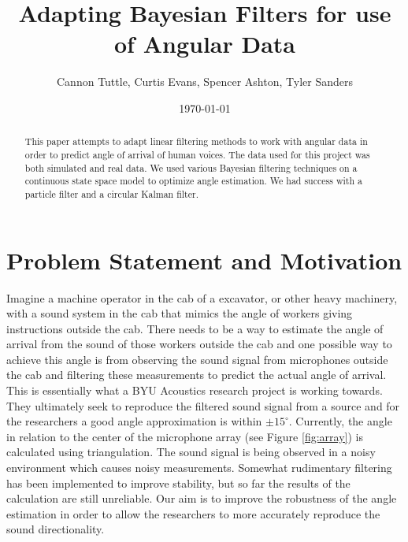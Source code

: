 \documentclass[11pt]{amsart}
\begin{document}
\title{Adapting Bayesian Filters for use of Angular Data}
\author{Cannon Tuttle, Curtis Evans, Spencer Ashton, Tyler Sanders}

\date{\today}

\begin{abstract}
    This paper attempts to adapt linear filtering methods to work with angular data in order to predict angle of arrival of human voices. The data used for this 
    project was both simulated and real data. We used various Bayesian filtering techniques on a continuous state space model to optimize angle estimation. We had
    success with a particle filter and a circular Kalman filter.
\end{abstract}

\maketitle

\section{Problem Statement and Motivation}
Imagine a machine operator in the cab of a excavator, or other heavy machinery, with a sound system in the cab that mimics the angle of workers giving instructions
outside the cab. There needs to be a way to estimate the angle of arrival from the sound of those workers outside the cab and one possible way to achieve this angle is from observing
the sound signal from microphones outside the cab and filtering these measurements to predict the actual angle of arrival. This is essentially what a BYU Acoustics research project is 
working towards. They ultimately seek to reproduce the filtered sound signal from a source and for the researchers a good angle approximation is within $\pm15^{\circ}$. Currently, the angle in relation to the center of the microphone array (see Figure \ref{fig:array}) 
is calculated using triangulation. The sound signal is being observed in a noisy environment which causes noisy measurements. Somewhat rudimentary filtering has been implemented to improve stability, 
but so far the results of the calculation are still unreliable. Our aim is to improve the robustness of the angle estimation in order to allow the researchers to more accurately reproduce the sound directionality.
\end{document}
